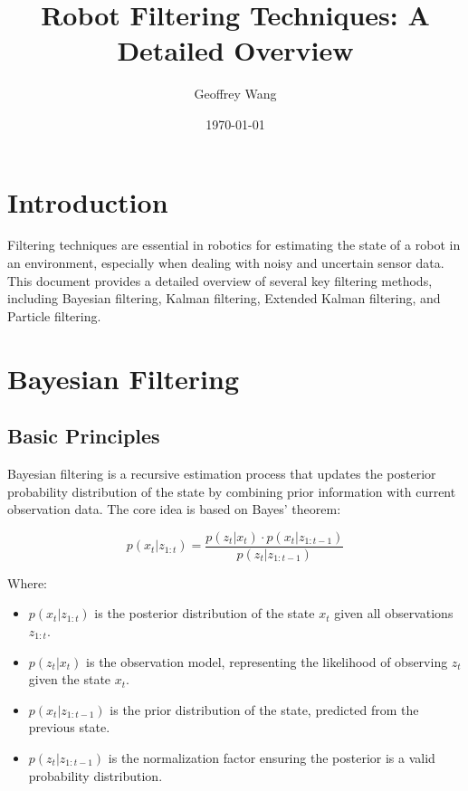 \documentclass{article}
\title{Robot Filtering Techniques: A Detailed Overview}
\author{Geoffrey Wang}
\date{\today}
\begin{document}
\maketitle

\tableofcontents

\section{Introduction}
Filtering techniques are essential in robotics for estimating the state of a robot in an environment, especially when dealing with noisy and uncertain sensor data. This document provides a detailed overview of several key filtering methods, including Bayesian filtering, Kalman filtering, Extended Kalman filtering, and Particle filtering.

\section{Bayesian Filtering}

\subsection{Basic Principles}
Bayesian filtering is a recursive estimation process that updates the posterior probability distribution of the state by combining prior information with current observation data. The core idea is based on Bayes' theorem:

\begin{equation}
p(x_t | z_{1:t}) = \frac{p(z_t | x_t) \cdot p(x_t | z_{1:t-1})}{p(z_t | z_{1:t-1})}
\end{equation}

Where:
\begin{itemize}
    \item \( p(x_t | z_{1:t}) \) is the posterior distribution of the state \( x_t \) given all observations \( z_{1:t} \).
    \item \( p(z_t | x_t) \) is the observation model, representing the likelihood of observing \( z_t \) given the state \( x_t \).
    \item \( p(x_t | z_{1:t-1}) \) is the prior distribution of the state, predicted from the previous state.
    \item \( p(z_t | z_{1:t-1}) \) is the normalization factor ensuring the posterior is a valid probability distribution.
\end{itemize}
\end{document}
